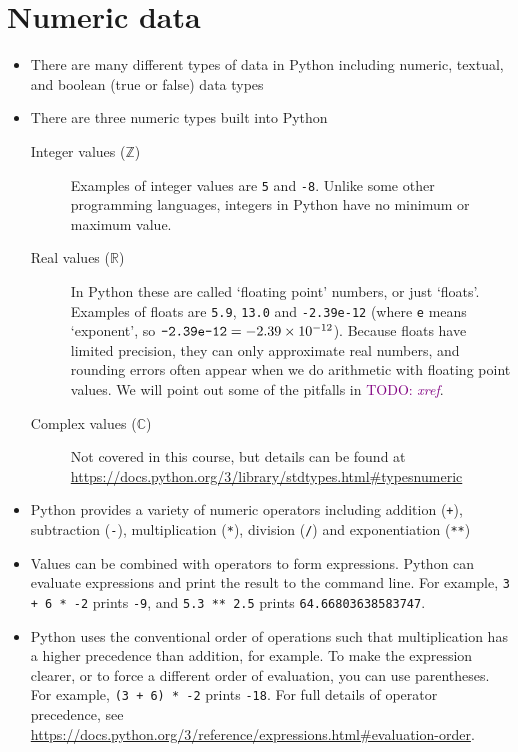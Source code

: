\documentclass[a4paper,twoside]{memoir}
\newcommand{\shellcmd}{\texttt}
\newcommand{\TODO}[1]{\textcolor{purple}{TODO: \emph{#1}}}
\begin{document}
\section{Numeric data}
\begin{itemize}
\item There are many different types of data in Python including numeric, textual, and boolean (true or false) data types
\item There are three numeric types built into Python
	\begin{description}
	\item[Integer values ($\mathbb{Z}$)]{Examples of integer values are \shellcmd{5} and \shellcmd{-8}.  Unlike some other programming languages, integers in Python have no minimum or maximum value.}
	\item[Real values ($\mathbb{R}$)]{In Python these are called `floating point' numbers, or just `floats'.  Examples of floats are \shellcmd{5.9}, \shellcmd{13.0} and \shellcmd{-2.39e-12} (where \shellcmd{e} means `exponent', so $\text{\shellcmd{-2.39e-12}} = \num{-2.39e-12}$).  Because floats have limited precision, they can only approximate real numbers, and rounding errors often appear when we do arithmetic with floating point values.  We will point out some of the pitfalls in \TODO{xref}.}
	\item[Complex values ($\mathbb{C}$)]{Not covered in this course, but details can be found at \url{https://docs.python.org/3/library/stdtypes.html#typesnumeric}}
	\end{description}
\item Python provides a variety of numeric operators including addition (\shellcmd{+}), subtraction (\shellcmd{-}), multiplication (\shellcmd{*}), division (\shellcmd{/}) and exponentiation (\shellcmd{**})
\item Values can be combined with operators to form expressions.  Python can evaluate expressions and print the result to the command line.  For example, \shellcmd{3 + 6 * -2} prints \shellcmd{-9}, and \shellcmd{5.3 ** 2.5} prints \shellcmd{64.66803638583747}.
\item Python uses the conventional order of operations such that multiplication has a higher precedence than addition, for example.  To make the expression clearer, or to force a different order of evaluation, you can use parentheses.  For example, \shellcmd{(3 + 6) * -2} prints \shellcmd{-18}.  For full details of operator precedence, see \url{https://docs.python.org/3/reference/expressions.html#evaluation-order}.
\end{itemize}
\end{document}
